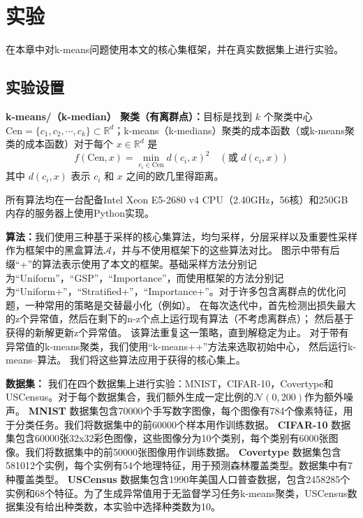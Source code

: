 \chapter{实验}


在本章中对k-means问题使用本文的核心集框架，并在真实数据集上进行实验。

\section{实验设置}
\textbf{k-means/（k-median） 聚类（有离群点）：}目标是找到 \( k \) 个聚类中心 \(\text{Cen} = \{c_1, c_2, \cdots, c_k\} \subset \mathbb{R}^d\)；k-means（k-medians）聚类的成本函数（或k-means聚类的成本函数）对于每个 \( x \in \mathbb{R}^d \) 是
\[
f(\text{Cen}, x) = \min_{c_i \in \text{Cen}} d(c_i, x)^2 \quad (\text{或 } d(c_i, x))
\]
其中 \( d(c_i, x) \) 表示 \( c_i \) 和 \( x \) 之间的欧几里得距离。


所有算法均在一台配备Intel Xeon E5-2680 v4 CPU（2.40GHz，56核）和250GB内存的服务器上使用Python实现。

\textbf{算法：}我们使用三种基于采样的核心集算法，均匀采样，分层采样以及重要性采样作为框架中的黑盒算法$\mathcal{A}$，并与不使用框架下的这些算法对比。
图示中带有后缀“+”的算法表示使用了本文的框架。基础采样方法分别记为“Uniform”，“GSP”，“Importance”，而使用框架的方法分别记为“Uniform+”，“Stratified+”，“Importance+”。对于许多包含离群点的优化问题，一种常用的策略是交替最小化（例如\cite{DBLP:conf/sdm/ChawlaG13}）。
在每次迭代中，首先检测出损失最大的z个异常值，然后在剩下的n-z个点上运行现有算法（不考虑离群点）；
然后基于获得的新解更新z个异常值。
该算法重复这一策略，直到解稳定为止。
对于带有异常值的k-means聚类，我们使用“k-means++”方法来选取初始中心，
然后运行k-means--算法\cite{DBLP:conf/sdm/ChawlaG13}。
我们将这些算法应用于获得的核心集上。

\textbf{数据集：}
我们在四个数据集上进行实验：MNIST，CIFAR-10，Covertype和USCensus。对于每个数据集合，我们额外生成一定比例的$\mathcal{N}(0,200)$作为额外噪声。
\textbf{MNIST} 数据集包含70000个手写数字图像，每个图像有784个像素特征，用于分类任务。我们将数据集中的前60000个样本用作训练数据。
\textbf{CIFAR-10} 数据集包含60000张32x32彩色图像，这些图像分为10个类别，每个类别有6000张图像。我们将数据集中的前50000张图像用作训练数据。
\textbf{Covertype} 数据集包含581012个实例，每个实例有54个地理特征，用于预测森林覆盖类型。数据集中有7种覆盖类型。
\textbf{USCensus} 数据集包含1990年美国人口普查数据，包含2458285个实例和68个特征。为了生成异常值用于无监督学习任务k-means聚类，USCensus数据集没有给出种类数，本实验中选择种类数为10。

